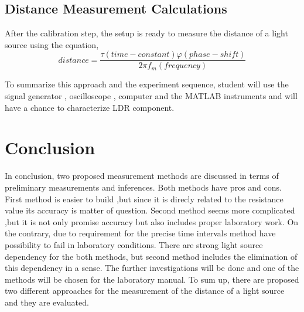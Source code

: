 \documentclass[letterpaper,12pt]{article}
\begin{document}
\subsection{Distance Measurement Calculations}
After the calibration step, the setup is ready to measure the distance of a light source using the equation,
\[distance = \frac{  \tau (time-constant)  \varphi (phase-shift)  }{2 \pi f_m (frequency)}\]

To summarize this approach and the experiment sequence, student will use the signal generator , oscilloscope , computer and the MATLAB instruments and will have a chance to characterize LDR component. 
\section{Conclusion}
In conclusion, two proposed measurement methods are discussed in terms of preliminary measurements and inferences. Both methods have pros and cons. First method is easier to build ,but since it is direcly related to the resistance value its accuracy is matter of question. Second method seems more complicated ,but it is not only promise accuracy but also includes proper laboratory work. On the contrary, due to requirement for the precise time intervals method have possibility to fail in laboratory conditions. There are strong light source dependency for the both methods, but second method includes the elimination of this dependency in a sense. The further investigations will be done and one of the methods will be chosen for the laboratory manual. To sum up, there are proposed two different approaches for the measurement of the distance of a light source and they are evaluated.   





\end{document}
